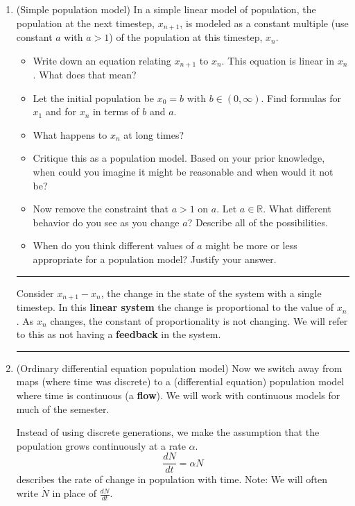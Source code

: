 \documentclass[12pt,letterpaper,noanswers]{exam}
\begin{document}
\begin{enumerate}
\item (Simple population model) In a simple linear model of population, the population at the next timestep, $x_{n+1}$, is modeled as a constant multiple (use constant $a$ with $a>1$) of the population at this timestep, $x_n$.
\begin{itemize}
\item Write down an equation relating $x_{n+1}$ to $x_n$.  This equation is linear in $x_n$.  What does that mean?
\item Let the initial population be $x_0 = b$ with $b \in (0,\infty)$.  Find formulas for $x_1$ and for $x_n$ in terms of $b$ and $a$.
\item What happens to $x_n$ at long times?
\item Critique this as a population model.  Based on your prior knowledge, when could you imagine it might be reasonable and when would it not be?
\item Now remove the constraint that $a>1$ on $a$.  Let $a \in \mathbb{R}$.  What
different behavior do you see as you change $a$?  Describe all of the possibilities. 
\item When do you think different values of $a$ might be more or less appropriate for a population model?  Justify your
answer.
\end{itemize}

\vspace{0.2cm}
\hrule
\vspace{0.2cm}

\begin{tcolorbox}
Consider $x_{n+1}-x_n$, the change in the state of the system with a single timestep.  In this \textbf{linear system} the change is proportional to the value of $x_n$.  As $x_n$ changes, the constant of proportionality is not changing.  We will refer to this as not having a \textbf{feedback} in the system.
\end{tcolorbox}



\vspace{0.2cm}
\hrule
\vspace{0.2cm}

\item
 (Ordinary differential equation population model) Now we switch away from maps (where time was discrete) to a (differential equation) population model where time is continuous (a \textbf{flow}).  We will work with continuous models for much of the semester. 

Instead of using discrete
generations, we make the assumption that the population grows continuously at a rate $\alpha$.
\[\frac{dN}{dt} = \alpha N\] describes the rate of change in population with time.  Note: We will
often write $\dot{N}$ in place of $\frac{dN}{dt}$.  


\end{enumerate}
\end{document}
